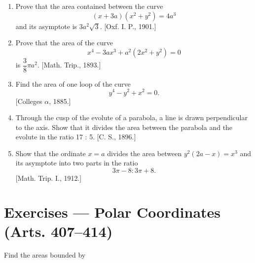 \documentclass[11pt, a4paper]{article}
\newcommand{\source}[1]{\hfill\textnormal{[#1]}}
\begin{document}
\begin{enumerate}[leftmargin=2em]
\item Prove that the area contained between the curve
\[
(x+3a)(x^2+y^2)=4a^3
\]
and its asymptote is $3a^2\sqrt3$. \source{Oxf. I. P., 1901.}

\item Prove that the area of the curve
\[
x^4-3ax^3+a^2(2x^2+y^2)=0
\]
is $\dfrac38\pi a^2$. \source{Math. Trip., 1893.}

\item Find the area of one loop of the curve
\[
y^4-y^2+x^2=0.
\]
\source{Colleges $\alpha$, 1885.}

\item Through the cusp of the evolute of a parabola, a line is drawn perpendicular to the axis. Show that it divides the area between the parabola and the evolute in the ratio 17 : 5. \source{C. S., 1896.}

\item Show that the ordinate $x=a$ divides the area between $y^2(2a-x)=x^3$ and its asymptote into two parts in the ratio
\[
3\pi-8:3\pi+8.
\]
\source{Math. Trip. I., 1912.}

\end{enumerate}

\section*{Exercises --- Polar Coordinates (Arts. 407--414)}

Find the areas bounded by
\end{document}
